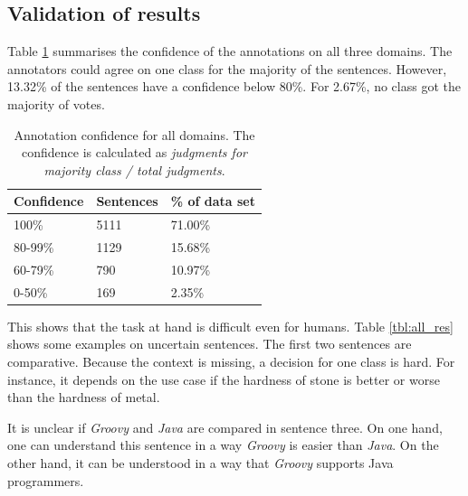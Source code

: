 \subsection{Validation of results}
Table \ref{fig:all_agg} summarises the confidence of the annotations on all three domains. The annotators could agree on one class for the majority of the sentences. However, 13.32\% of the sentences have a confidence below 80\%. For 2.67\%, no class got the majority of votes. 

\begin{table}[h]
\caption{Annotation confidence for all domains. The confidence is calculated as \emph{judgments for majority class / total judgments}.}
\label{fig:all_agg}
\begin{tabularx}{\textwidth}{XXX}
\toprule
Confidence & Sentences & \% of data set \\
\midrule
100\%	&	5111	&	71.00\%	 \\ 
80-99\%	&	1129	&	15.68\%	 \\ 
60-79\%	&	790	&	10.97\%	 \\ 
0-50\%	&	169	&	2.35\%	 \\ 
\bottomrule
\end{tabularx}
\end{table}

This shows that the task at hand is difficult even for humans. Table \ref{tbl:all_res} shows some examples on uncertain sentences. The first two sentences are comparative. Because the context is missing, a decision for one class is hard. For instance, it depends on the use case if the hardness of stone is better or worse than the hardness of metal.

It is unclear if \emph{Groovy} and \emph{Java} are compared in sentence three. On one hand, one can understand this sentence in a way \emph{Groovy} is easier than \emph{Java}. On the other hand, it can be understood in a way that \emph{Groovy} supports Java programmers.


